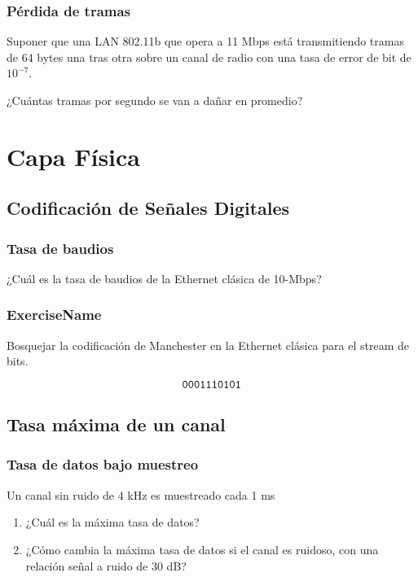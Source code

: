 \documentclass[12pt]{report}
\begin{document}
\begin{exer}
\subsection{Pérdida de tramas \sthree}
Suponer que una LAN 802.11b que opera a 11 Mbps está transmitiendo tramas de 64 bytes una tras otra sobre un canal de radio con una tasa de error de bit de $10^{-7}$. 

¿Cuántas tramas por segundo se van a dañar en promedio?
\end{exer}

%
%


\chapter{Capa Física}

\begin{exer}
\section{Codificación de Señales Digitales}
\subsection{Tasa de baudios \stwo \steo}
¿Cuál es la tasa de baudios de la Ethernet clásica de 10-Mbps?
\end{exer}

\begin{exer}
\subsection{ExerciseName \sone}
Bosquejar la codificación de Manchester en la Ethernet clásica para el stream de bits.

$$ \texttt{0001110101} $$
\end{exer}

\begin{exer}
\section{Tasa máxima de un canal}
\subsection{Tasa de datos bajo muestreo \sthree}
Un canal sin ruido de 4 kHz es muestreado cada 1 ms

\begin{enumerate}
\item ¿Cuál es la máxima tasa de datos?
\item ¿Cómo cambia la máxima tasa de datos si el canal es ruidoso, con una relación señal a ruido de 30 dB?
\end{enumerate}
\end{exer}
\end{document}
